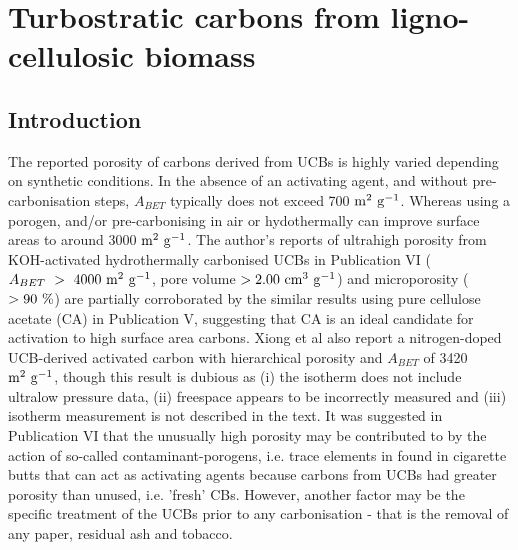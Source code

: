\chapter{Turbostratic carbons from ligno-cellulosic biomass}
\label{ch:cbs}

\newpage

\section{Introduction}

The reported porosity of carbons derived from UCBs is highly varied depending on synthetic conditions. In the absence of an activating agent, and without pre-carbonisation steps, $A_{BET}$ typically does not exceed 700 $\rm m^2\ g^{-1}$.\citep{Koochaki2019, Soltani2013, Yazdi2012, Lee2014, Hamzah2017} Whereas using a porogen, and/or pre-carbonising in air or hydothermally can improve surface areas to around 3000 $\rm m^2\ g^{-1}$.\citep{xiong2018, Koochaki2019, Sun2017, Bilge2019} The author's reports of ultrahigh porosity from KOH-activated hydrothermally carbonised UCBs in Publication VI ($A_{BET}\ \rm >\ 4000\ m^2\ g^{-1} $, pore volume $\rm > 2.00\ cm^3\ g^{-1}$) and microporosity ($\rm > 90\ \%$) are partially corroborated by the similar results using pure cellulose acetate (CA) in Publication V, suggesting that CA is an ideal candidate for activation to high surface area carbons. Xiong et al also report a nitrogen-doped UCB-derived activated carbon with hierarchical porosity and $A_{BET}$ of 3420 $\rm m^2\ g^{-1}$, though this result is dubious as (i) the  isotherm does not include ultralow pressure data, (ii) freespace appears to be incorrectly measured and (iii) isotherm measurement is not described in the text.\citep{xiong2019nitrogen} It was suggested in Publication VI that the unusually high porosity may be contributed to by the action of so-called contaminant-porogens, i.e. trace elements in found in cigarette butts that can act as activating agents because carbons from UCBs had greater porosity than unused, i.e. 'fresh' CBs. However, another factor may be the specific treatment of the UCBs prior to any carbonisation - that is the removal of any paper, residual ash and tobacco.

